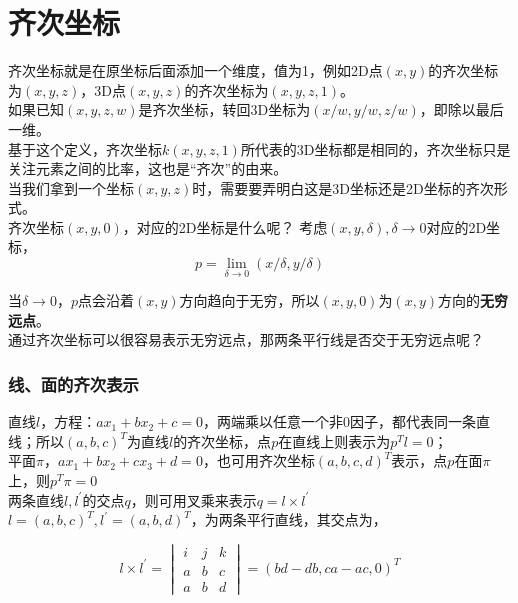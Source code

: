 \section{齐次坐标}
	齐次坐标就是在原坐标后面添加一个维度，值为1，例如2D点$(x,y)$的齐次坐标为$(x,y,z)$，3D点$(x,y,z)$的齐次坐标为$(x,y,z,1)$。\\

	如果已知$(x,y,z,w)$是齐次坐标，转回3D坐标为$(x/w,y/w,z/w)$，即除以最后一维。\\

	基于这个定义，齐次坐标$k(x,y,z,1)$所代表的3D坐标都是相同的，齐次坐标只是关注元素之间的比率，这也是“齐次”的由来。\\

	当我们拿到一个坐标$(x,y,z)$时，需要要弄明白这是3D坐标还是2D坐标的齐次形式。\\

	齐次坐标$(x,y,0)$，对应的2D坐标是什么呢？ 考虑$(x,y,\delta), \delta\rightarrow 0$对应的2D坐标，
	$$
		p = \lim_{\delta\rightarrow 0} (x/\delta, y/\delta)
	$$

	当$\delta\rightarrow 0$，$p$点会沿着$(x,y)$方向趋向于无穷，所以$(x,y,0)$为$(x,y)$方向的\textbf{无穷远点}。\\

	通过齐次坐标可以很容易表示无穷远点，那两条平行线是否交于无穷远点呢？

	\subsubsection*{线、面的齐次表示}
		直线$l$，方程：$ax_1 + bx_2 +c =0$，两端乘以任意一个非0因子，都代表同一条直线；所以$(a,b,c)^T$为直线$l$的齐次坐标，点$p$在直线上则表示为$p^Tl = 0$；\\

		平面$\pi$，$ax_1 + bx_2 + cx_3 +d = 0$，也可用齐次坐标$(a,b,c,d)^T$表示，点$p$在面$\pi$上，则$p^T\pi = 0$\\

		两条直线$l,l^\prime$的交点$q$，则可用叉乘来表示$q = l\times l^\prime$\\

		$l=(a,b,c)^T, l^\prime = (a,b,d)^T$，为两条平行直线，其交点为，
		
		\begin{equation}
			l\times l^{\prime} = 
							\begin{vmatrix}
								i & j& k \\
								a & b& c\\
								a & b& d
							\end{vmatrix}
			= (bd-db, ca-ac, 0)^T
		\end{equation}

